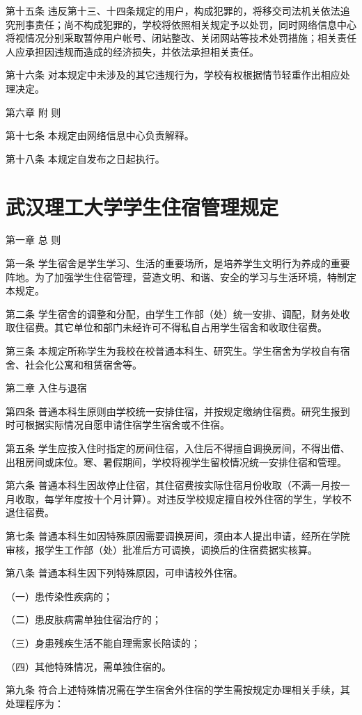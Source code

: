 \documentclass[UTF8,12pt,a4paper]{report}
\begin{document}
第十五条 违反第十三、十四条规定的用户，构成犯罪的，将移交司法机关依法追究刑事责任；尚不构成犯罪的，学校将依照相关规定予以处罚，同时网络信息中心将视情况分别采取暂停用户帐号、闭站整改、关闭网站等技术处罚措施；相关责任人应承担因违规而造成的经济损失，并依法承担相关责任。

第十六条 对本规定中未涉及的其它违规行为，学校有权根据情节轻重作出相应处理决定。

第六章 附 则

第十七条 本规定由网络信息中心负责解释。

第十八条 本规定自发布之日起执行。
\chapter{武汉理工大学学生住宿管理规定}
第一章 总 则

第一条 学生宿舍是学生学习、生活的重要场所，是培养学生文明行为养成的重要阵地。为了加强学生住宿管理，营造文明、和谐、安全的学习与生活环境，特制定本规定。

第二条 学生宿舍的调整和分配，由学生工作部（处）统一安排、调配，财务处收取住宿费。其它单位和部门未经许可不得私自占用学生宿舍和收取住宿费。

第三条 本规定所称学生为我校在校普通本科生、研究生。学生宿舍为学校自有宿舍、社会化公寓和租赁宿舍等。

第二章 入住与退宿

第四条 普通本科生原则由学校统一安排住宿，并按规定缴纳住宿费。研究生报到时可根据实际情况自愿申请住宿学生宿舍或不住宿。

第五条 学生应按入住时指定的房间住宿，入住后不得擅自调换房间，不得出借、出租房间或床位。寒、暑假期间，学校将视学生留校情况统一安排住宿和管理。

第六条 普通本科生因故停止住宿，其住宿费按实际住宿月份收取（不满一月按一月收取，每学年度按十个月计算）。对违反学校规定擅自校外住宿的学生，学校不退住宿费。

第七条 普通本科生如因特殊原因需要调换房间，须由本人提出申请，经所在学院审核，报学生工作部（处）批准后方可调换，调换后的住宿费据实核算。

第八条 普通本科生因下列特殊原因，可申请校外住宿。

（一）患传染性疾病的；

（二）患皮肤病需单独住宿治疗的；

（三）身患残疾生活不能自理需家长陪读的；

（四）其他特殊情况，需单独住宿的。

第九条 符合上述特殊情况需在学生宿舍外住宿的学生需按规定办理相关手续，其处理程序为：
\end{document}
